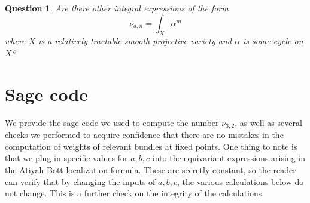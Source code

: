 \documentclass[reqno, 11pt]{amsart}
\theoremstyle{plain}
\newtheorem{question}[theorem]{Question}
\theoremstyle{remark}
\begin{document}
\begin{question}
    \label{question:integral} Are there other integral expressions of the form \[\nu_{d,n} = \int_{X} \alpha^{m}\] where $X$ is a relatively tractable smooth projective variety and $\alpha$ is some cycle on $X$? 
\end{question}


\section{Sage code}
\label{sec:sagecode}

We provide the sage code we used to compute the number $\nu_{3,2}$, as well as several checks we performed to acquire confidence that there are no mistakes in the computation of weights of relevant bundles at fixed points. One thing to note is that we plug in specific values for $a,b,c$ into the equivariant expressions arising in the Atiyah-Bott localization formula. These are secretly constant, so the reader can verify that by changing the inputs of $a,b,c$, the various calculations below do not change. This is a further check on the integrity of the calculations.
\end{document}
